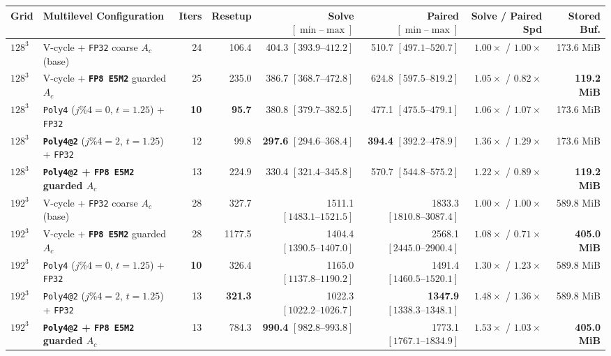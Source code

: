 \documentclass[10pt]{article}
\begin{document}
\begin{table}[t]
\centering\scriptsize
\begin{tabular}{@{}llrrrrrr@{}}
\toprule
Grid & Multilevel Configuration & Iters & Resetup & Solve $[\min\text{--}\max]$ & Paired $[\min\text{--}\max]$ & Solve / Paired Spd & Stored Buf. \\
\midrule
$128^3$ & V-cycle + \texttt{FP32} coarse $A_c$ (base) & 24 & 106.4 & 404.3 $[393.9\text{--}412.2]$ & 510.7 $[497.1\text{--}520.7]$ & $1.00\times$ / $1.00\times$ & 173.6 MiB \\
$128^3$ & V-cycle + \textbf{\texttt{FP8 E5M2}} guarded $A_c$ & 25 & 235.0 & 386.7 $[368.7\text{--}472.8]$ & 624.8 $[597.5\text{--}819.2]$ & $1.05\times$ / $0.82\times$ & \textbf{119.2 MiB} \\
$128^3$ & \texttt{Poly4} ($j\%4=0$, $t=1.25$) + \texttt{FP32} & \textbf{10} & \textbf{95.7} & 380.8 $[379.7\text{--}382.5]$ & 477.1 $[475.5\text{--}479.1]$ & $1.06\times$ / $1.07\times$ & 173.6 MiB \\
$128^3$ & \textbf{\texttt{Poly4@2}} ($j\%4=2$, $t=1.25$) + \texttt{FP32} & 12 & 99.8 & \textbf{297.6} $[294.6\text{--}368.4]$ & \textbf{394.4} $[392.2\text{--}478.9]$ & $\mathbf{1.36\times}$ / $\mathbf{1.29\times}$ & 173.6 MiB \\
$128^3$ & \textbf{\texttt{Poly4@2} + \texttt{FP8 E5M2} guarded $A_c$} & 13 & 224.9 & 330.4 $[321.4\text{--}345.8]$ & 570.7 $[544.8\text{--}575.2]$ & $\mathbf{1.22\times}$ / $0.89\times$ & \textbf{119.2 MiB} \\
\midrule
$192^3$ & V-cycle + \texttt{FP32} coarse $A_c$ (base) & 28 & 327.7 & 1511.1 $[1483.1\text{--}1521.5]$ & 1833.3 $[1810.8\text{--}3087.4]$ & $1.00\times$ / $1.00\times$ & 589.8 MiB \\
$192^3$ & V-cycle + \textbf{\texttt{FP8 E5M2}} guarded $A_c$ & 28 & 1177.5 & 1404.4 $[1390.5\text{--}1407.0]$ & 2568.1 $[2445.0\text{--}2900.4]$ & $1.08\times$ / $0.71\times$ & \textbf{405.0 MiB} \\
$192^3$ & \texttt{Poly4} ($j\%4=0$, $t=1.25$) + \texttt{FP32} & \textbf{10} & 326.4 & 1165.0 $[1137.8\text{--}1190.2]$ & 1491.4 $[1460.5\text{--}1520.1]$ & $\mathbf{1.30\times}$ / $\mathbf{1.23\times}$ & 589.8 MiB \\
$192^3$ & \texttt{Poly4@2} ($j\%4=2$, $t=1.25$) + \texttt{FP32} & 13 & \textbf{321.3} & 1022.3 $[1022.2\text{--}1026.7]$ & \textbf{1347.9} $[1338.3\text{--}1348.1]$ & $\mathbf{1.48\times}$ / $\mathbf{1.36\times}$ & 589.8 MiB \\
$192^3$ & \textbf{\texttt{Poly4@2} + \texttt{FP8 E5M2} guarded $A_c$} & 13 & 784.3 & \textbf{990.4} $[982.8\text{--}993.8]$ & 1773.1 $[1767.1\text{--}1834.9]$ & $\mathbf{1.53\times}$ / $1.03\times$ & \textbf{405.0 MiB} \\

\end{tabular}
\end{table}
\end{document}

